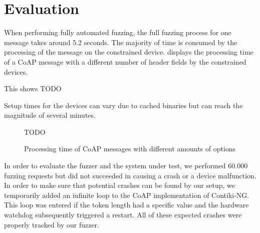 \section{Evaluation}
\label{section:evaluation}


When performing fully automated fuzzing, the full fuzzing process for one message takes around 5.2 seconds. The majority of time is consumed by the processing of the message on the constrained device.  displays the processing time of a CoAP message with a different number of header fields by the constrained devices.

This shows TODO

Setup times for the devices can vary due to cached binaries but can reach the magnitude of several minutes.

\begin{figure}[h]
	\centering
	TODO
	\caption{Processing time of CoAP messages with different amounts of options}
	\label{figure:fuzzing_performance}
\end{figure}

In order to evaluate the fuzzer and the system under test, we performed 60.000 fuzzing requests but did not succeeded in causing a crash or a device malfunction. In order to make sure that potential crashes can be found by our setup, we temporarily added an infinite loop to the CoAP implementation of Contiki-NG. This loop was entered if the token length had a specific value and the hardware watchdog subsequently triggered a restart. All of these expected crashes were properly tracked by our fuzzer.
